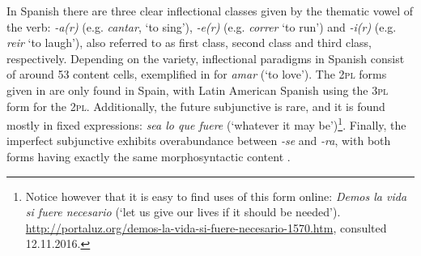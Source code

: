 In Spanish there are three clear inflectional classes given by the thematic vowel of the verb: \textit{-a(r)} (e.g. \textit{cantar}, `to sing'), \textit{-e(r)} (e.g. \textit{correr} `to run') and \textit{-i(r)} (e.g. \textit{reir} `to laugh'), also referred to as first class, second class and third class, respectively. Depending on the variety, inflectional paradigms in Spanish consist of around 53 content cells, exemplified in  for \textit{amar} (`to love'). The \textsc{2pl} forms given in  are only found in Spain, with Latin American Spanish using the \textsc{3pl} form for the \textsc{2pl}. Additionally, the future subjunctive is rare, and it is found mostly in fixed expressions: \textit{sea lo que fuere} (`whatever it may be')\footnote{Notice however that it is easy to find uses of this form online: \textit{Demos la vida si fuere necesario} (`let us give our lives if it should be needed'). \url{http://portaluz.org/demos-la-vida-si-fuere-necesario-1570.htm}, consulted 12.11.2016.}. Finally, the imperfect subjunctive exhibits overabundance \autocites{Thornton.2010a, Thornton.2010} between \textit{-se} and \textit{-ra}, with both forms having exactly the same morphosyntactic content \autocites{Cuervo.1981, DeMello.1993, Kempas.2011, Rojo.2008, Schwenter.2013}.
